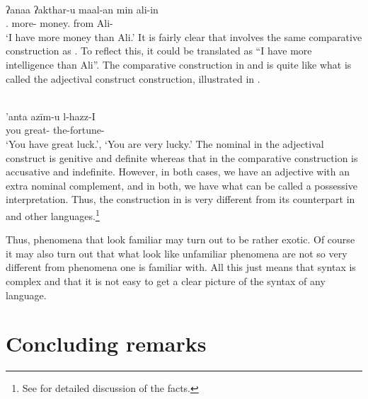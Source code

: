 \documentclass[output=paper]{langsci/langscibook}
\begin{document}
\ea\label{ex:borsley:4.35}\\
    \gll ʔanaa        ʔakthar-u    maal-an      min    ali-in\\
            \Fsg.\M{} more-\Nom{} money.\Acc{} from Ali-\Gen{}\\
    \glt    \enquote*{I have more money than Ali.}
\z
%
It is fairly clear that  involves the same comparative
construction as . To reflect this, it could be translated as
\enquote{I have more intelligence than Ali}. The comparative construction in
 and  is quite like what is called the
adjectival construct construction, illustrated in .

\ea\label{ex:borsley:4.36}\\
    \gll ’anta    azīm-u        l-hazz-I\\
            you    great-\Nom{}    the-fortune-\Gen{}\\
    \glt    \enquote*{You have great luck.}, \enquote*{You are very lucky.}
\z
%
The nominal in the adjectival construct is genitive and definite whereas that
in the comparative construction is accusative and indefinite. However, in both
cases, we have an adjective with an extra nominal complement, and in both, we
have what can be called a possessive interpretation. Thus, the construction in
 is very different from its counterpart in  and
other languages.\footnote{See \citet{AlsArnBor2017} for detailed discussion of
the facts.}

Thus, phenomena that look familiar may turn out to be rather exotic. Of course
it may also turn out that what look like unfamiliar phenomena are not so very
different from phenomena one is familiar with. All this just means that syntax
is complex and that it is not easy to get a clear picture of the syntax of any
language.

\section{Concluding remarks}\label{sec-5:conclusions}
\end{document}

